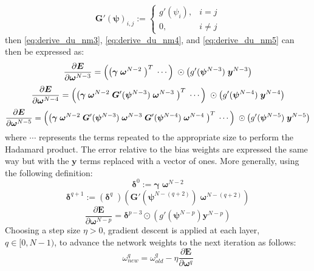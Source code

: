 \documentclass{article}
\begin{document}
%
\begin{equation} \label{eq:Gp}
\bm{G}' (\bm{\psi})_{i,j} :=
\begin{cases}
g' (\psi_i), & i = j \\
0, & i \neq j
\end{cases}
\end{equation}
%
then \eqref{eq:derive_du_nm3}, \eqref{eq:derive_du_nm4}, and \eqref{eq:derive_du_nm5} can then be expressed as:
%
\begin{equation} \label{eq:derive_du_nm3_matrix}
\frac{\partial \bm{E}}{\partial \bm{\omega}^{N-3}} =
\left(
\left(
\bm{\gamma} \;
\bm{\omega}^{N-2} \;
\right)^T \;
\cdots
\right) \;
\odot
\left(
g' (\bm{\psi}^{N-3}) \;
\bm{y}^{N-3} \\
\right)
\end{equation}
%
\begin{equation} \label{eq:derive_du_nm4_matrix}
\frac{\partial \bm{E}}{\partial \bm{\omega}^{N-4}} =
\left(
\left(
\bm{\gamma} \;
\bm{\omega}^{N-2} \;
\bm{G}' (\bm{\psi}^{N-3}) \;
\bm{\omega}^{N-3} \;
\right)^T \;
\cdots
\right) \;
\odot
\left(
g' (\bm{\psi}^{N-4}) \;
\bm{y}^{N-4} \\
\right)
\end{equation}
%
\begin{equation} \label{eq:derive_du_nm5_matrix}
\frac{\partial \bm{E}}{\partial \bm{\omega}^{N-5}} =
\left(
\left(
\bm{\gamma} \;
\bm{\omega}^{N-2} \;
\bm{G}' (\bm{\psi}^{N-3}) \;
\bm{\omega}^{N-3} \;
\bm{G}' (\bm{\psi}^{N-4}) \;
\bm{\omega}^{N-4} \;
\right)^T \;
\cdots
\right) \;
\odot
\left(
g' (\bm{\psi}^{N-5}) \;
\bm{y}^{N-5} \\
\right)
\end{equation}
%
where $\cdots$ represents the terms repeated to the appropriate size to perform the Hadamard product.
The error relative to the bias weights are expressed the same way but with the $\bm{y}$ terms replaced with a vector of ones.
More generally, using the following definition:
%
\begin{equation} \label{eq:delta0}
\bm{\delta}^0 := \bm{\gamma} \; \bm{\omega}^{N-2}
\end{equation}
%
\begin{equation} \label{eq:deltaq}
\bm{\delta}^{q+1} :=
\left(
\bm{\delta}^q \;
\right)
\left(
\bm{G}' (\bm{\psi}^{N-(q+2)}) \;
\bm{\omega}^{N-(q+2)}
\right)
\end{equation}
%
\begin{equation} \label{eq:derive_du_nmp_matrix_delta}
\frac{\partial \bm{E}}{\partial \bm{\omega}^{N-p}} =
\bm{\delta}^{p-3}
\odot
\left(
g' \left( \bm{\psi}^{N-p} \right)
\bm{y}^{N-p}
\right)
\end{equation}
%
Choosing a step size $\eta > 0$, gradient descent is applied at each layer, $q \in [0, N-1)$, to advance the network weights to the next iteration as follows:
%
\begin{equation} \label{eq:end_weights}
\omega_{new}^q = \omega_{old}^q - \eta
\frac{\partial \bm{E}}{\partial \bm{\omega}^q}
\end{equation}
%
\end{document}
